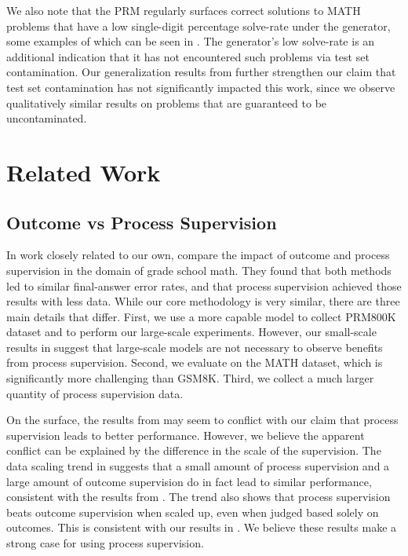 \documentclass{article}
\begin{document}
We also note that the PRM regularly surfaces correct solutions to MATH problems that have a low single-digit percentage solve-rate under the generator, some examples of which can be seen in . The generator's low solve-rate is an additional indication that it has not encountered such problems via test set contamination. Our generalization results from  further strengthen our claim that test set contamination has not significantly impacted this work, since we observe qualitatively similar results on problems that are guaranteed to be uncontaminated.

\section{Related Work}

\subsection{Outcome vs Process Supervision}

In work closely related to our own, \cite{uesato2022solving} compare the impact of outcome and process supervision in the domain of grade school math. They found that both methods led to similar final-answer error rates, and that process supervision achieved those results with less data. While our core methodology is very similar, there are three main details that differ. First, we use a more capable model to collect PRM800K dataset and to perform our large-scale experiments. However, our small-scale results in  suggest that large-scale models are not necessary to observe benefits from process supervision. Second, we evaluate on the MATH dataset, which is significantly more challenging than GSM8K. Third, we collect a much larger quantity of process supervision data.

On the surface, the results from \cite{uesato2022solving} may seem to conflict with our claim that process supervision leads to better performance. However, we believe the apparent conflict can be explained by the difference in the scale of the supervision. The data scaling trend in  suggests that a small amount of process supervision and a large amount of outcome supervision do in fact lead to similar performance, consistent with the results from \cite{uesato2022solving}. The trend also shows that process supervision beats outcome supervision when scaled up, even when judged based solely on outcomes. This is consistent with our results in . We believe these results make a strong case for using process supervision.
\end{document}
